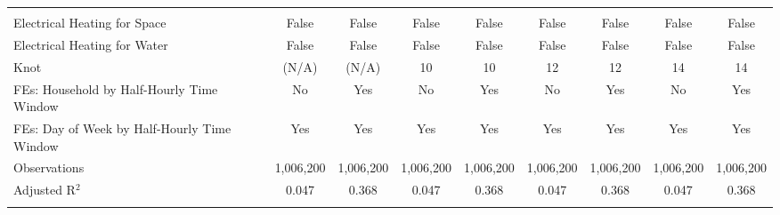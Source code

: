 \begin{table}[!htbp]
\begin{longtable}{@{\extracolsep{0pt}}lcccccccc}
\hline \\[-1.8ex] 
Electrical Heating for Space & False & False & False & False & False & False & False & False \\ 
Electrical Heating for Water & False & False & False & False & False & False & False & False \\ 
Knot & (N/A) & (N/A) & 10 & 10 & 12 & 12 & 14 & 14 \\ 
FEs: Household by Half-Hourly Time Window & No & Yes & No & Yes & No & Yes & No & Yes \\ 
FEs: Day of Week by Half-Hourly Time Window & Yes & Yes & Yes & Yes & Yes & Yes & Yes & Yes \\ 
Observations & 1,006,200 & 1,006,200 & 1,006,200 & 1,006,200 & 1,006,200 & 1,006,200 & 1,006,200 & 1,006,200 \\ 
Adjusted R$^{2}$ & 0.047 & 0.368 & 0.047 & 0.368 & 0.047 & 0.368 & 0.047 & 0.368 \\ 
\hline 
\hline \\[-1.8ex] 
\end{longtable} 
\end{table} 
